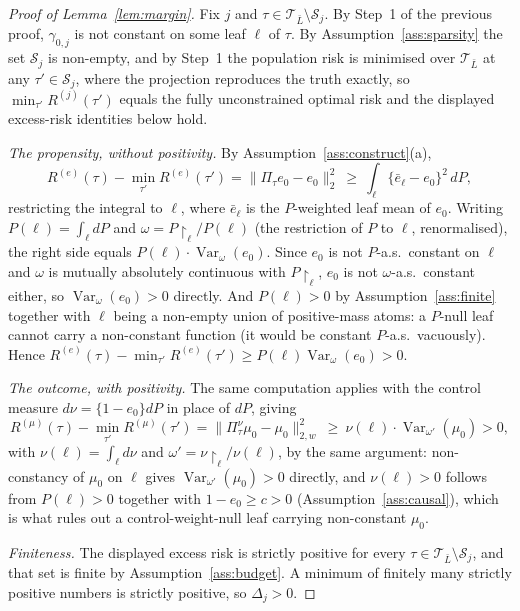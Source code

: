 \documentclass[11pt]{article}
\theoremstyle{plain}
\theoremstyle{definition}
\theoremstyle{remark}
\newcommand{\cT}{\mathcal{T}}
\newcommand{\cS}{\mathcal{S}}
\newcommand{\ez}{e_0}
\newcommand{\mz}{\mu_0}
\newcommand{\Ltwo}[1]{\lVert #1 \rVert_{2}}
\newcommand{\Lw}[1]{\lVert #1 \rVert_{2,w}}
\DeclareMathOperator{\Var}{Var}
\begin{document}
\begin{proof}[Proof of Lemma~\ref{lem:margin}]
Fix $j$ and $\tau\in\cT_{\bar L}\setminus\cS_j$. By Step~1 of the previous proof,
$\gamma_{0,j}$ is not constant on some leaf $\ell$ of $\tau$. By
Assumption~\ref{ass:sparsity} the set $\cS_j$ is non-empty, and by Step~1 the
population risk is minimised over $\cT_{\bar L}$ at any $\tau'\in\cS_j$, where the
projection reproduces the truth exactly, so $\min_{\tau'}R^{(j)}(\tau')$ equals
the fully unconstrained optimal risk and the displayed excess-risk identities
below hold.

\emph{The propensity, without positivity.} By
Assumption~\ref{ass:construct}(a),
\[
  R^{(e)}(\tau)-\min_{\tau'}R^{(e)}(\tau')
  =\Ltwo{\Pi_\tau\ez-\ez}^2
  \ \ge\ \int_\ell\bigl\{\bar e_\ell-\ez\bigr\}^2\,dP ,
\]
restricting the integral to $\ell$, where $\bar e_\ell$ is the $P$-weighted
leaf mean of $\ez$. Writing $P(\ell)=\int_\ell dP$ and $\omega=P\restriction_\ell/P(\ell)$
(the restriction of $P$ to $\ell$, renormalised), the right side equals
$P(\ell)\cdot\Var_\omega(\ez)$. Since $\ez$ is not $P$-a.s.\ constant on
$\ell$ and $\omega$ is mutually absolutely continuous with $P\restriction_\ell$,
$\ez$ is not $\omega$-a.s.\ constant either, so $\Var_\omega(\ez)>0$
directly. And $P(\ell)>0$ by Assumption~\ref{ass:finite} together with
$\ell$ being a non-empty union of positive-mass atoms: a $P$-null leaf
cannot carry a non-constant function (it would be constant $P$-a.s.\
vacuously). Hence $R^{(e)}(\tau)-\min_{\tau'}R^{(e)}(\tau')\ge P(\ell)\Var_\omega(\ez)>0$.

\emph{The outcome, with positivity.} The same computation applies with the
control measure $d\nu=\{1-\ez\}dP$ in place of $dP$, giving
\[
  R^{(\mu)}(\tau)-\min_{\tau'}R^{(\mu)}(\tau')
  =\Lw{\Pi^\nu_\tau\mz-\mz}^2
  \ \ge\ \nu(\ell)\cdot\Var_{\omega'}(\mz)>0 ,
\]
with $\nu(\ell)=\int_\ell d\nu$ and $\omega'=\nu\restriction_\ell/\nu(\ell)$,
by the same argument: non-constancy of $\mz$ on $\ell$ gives
$\Var_{\omega'}(\mz)>0$ directly, and $\nu(\ell)>0$ follows from $P(\ell)>0$
together with $1-\ez\ge c>0$ (Assumption~\ref{ass:causal}), which is what
rules out a control-weight-null leaf carrying non-constant $\mz$.

\emph{Finiteness.} The displayed excess risk is strictly positive for every
$\tau\in\cT_{\bar L}\setminus\cS_j$, and that set is finite by
Assumption~\ref{ass:budget}. A minimum of finitely many strictly positive
numbers is strictly positive, so $\Delta_j>0$.
\end{proof}
\end{document}
